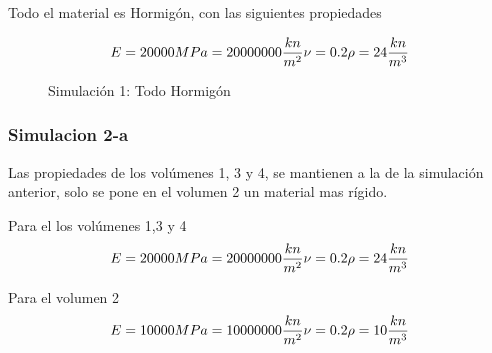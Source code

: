 \documentclass[12pt, a4paper]{article}
\begin{document}
Todo el material es Hormigón, con las siguientes propiedades

\begin{equation*}
	E=20000 MPa = 20000000 \frac{kn}{m^2} \\
	\nu = 0.2 \\
	\rho = 24 \frac{kn}{m^3}
\end{equation*}
 
\begin{figure}[h]
	\centering
	\caption{Simulación 1: Todo Hormigón}
\end{figure}

\subsubsection{Simulacion 2-a}

Las propiedades de los volúmenes 1, 3 y 4, se mantienen a la de la simulación anterior, solo se pone en el volumen 2 un material mas rígido.

Para el los volúmenes 1,3 y 4
\begin{equation*}
	E=20000 MPa = 20000000 \frac{kn}{m^2} \\
	\nu = 0.2 \\
	\rho = 24 \frac{kn}{m^3}
\end{equation*}

Para el volumen 2
\begin{equation*}
	E=10000 MPa = 10000000 \frac{kn}{m^2} \\
	\nu = 0.2 \\
	\rho = 10 \frac{kn}{m^3}
\end{equation*}
\end{document}
